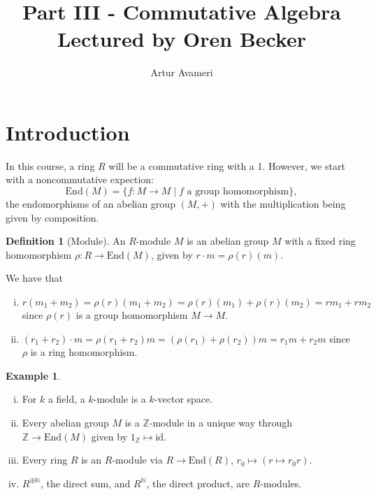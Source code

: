 \documentclass{article}
\title{Part III - Commutative Algebra
    \\ \large
    Lectured by Oren Becker
}
\author{Artur Avameri}
\date{}
\theoremstyle{definition}
\newtheorem{example}{Example}[section]
\newtheorem{defn}{Definition}[section]
\begin{document}
\maketitle
\tableofcontents
\newpage

\section{Introduction}


In this course, a ring $R$ will be a commutative ring with a 1. However, we start with a noncommutative expection: $$\text{End}(M) = \{f: M \to M \mid f \text{ a group homomorphism}\},$$ the endomorphisms of an abelian group $(M, +)$ with the multiplication being given by composition.

\begin{defn}[Module]
    An $R$-module $M$ is an abelian group $M$ with a fixed ring homomorphism $\rho : R \to \text{End}(M)$, given by $r \cdot  m =\rho(r)(m)$.
\end{defn}
We have that
\begin{enumerate}[(i)]
    \item $r(m_1 + m_2) = \rho(r)(m_1+m_2) = \rho(r)(m_1) + \rho(r)(m_2) = rm_1 + rm_2$ since $\rho(r)$ is a group homomorphism $M \to M$.
    \item $(r_1 +r_2)\cdot m = \rho(r_1+r_2)m = (\rho(r_1)+\rho(r_2))m =r_1m+r_2m$ since $\rho$ is a ring homomorphism.
\end{enumerate}

\begin{example}
    \begin{enumerate}[(i)]
        \item For $k$ a field, a $k$-module is a $k$-vector space.
        \item Every abelian group $M$ is a $\mathbb{Z}$-module in a unique way through $\mathbb{Z} \to \text{End}(M)$ given by $1_{\mathbb{Z}} \mapsto \text{id}$.
        \item Every ring $R$ is an $R$-module via $R \to \text{End}(R)$, $r_0 \mapsto (r \mapsto r_0r)$.
        \item $R^{\oplus \mathbb{N}}$, the direct sum, and $R^\mathbb{N}$, the direct product, are $R$-modules.
    \end{enumerate}
\end{example}
\end{document}
